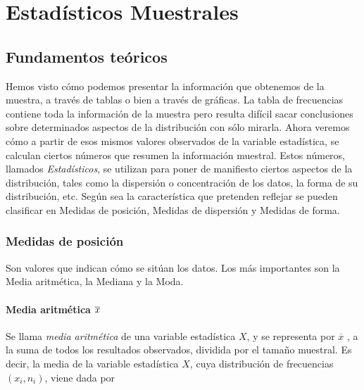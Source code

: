 
\chapter{Estadísticos Muestrales}

\section{Fundamentos teóricos}

Hemos visto cómo podemos presentar la información que obtenemos de
la muestra, a través de tablas o bien a través de gráficas. La tabla
de frecuencias contiene toda la información de la muestra pero
resulta difícil sacar conclusiones sobre determinados aspectos de la
distribución con sólo mirarla. Ahora veremos cómo a partir de esos
mismos valores observados de la variable estadística, se calculan
ciertos números que resumen la información muestral. Estos números,
llamados \emph{Estadísticos}, se utilizan para poner de manifiesto
ciertos aspectos de la distribución, tales como la dispersión o
concentración de los datos, la forma de su distribución, etc. Según
sea la característica que pretenden reflejar se pueden clasificar en
Medidas de posición, Medidas de dispersión y Medidas de forma.

\subsection{Medidas de posición}

Son valores que indican cómo se sitúan los datos. Los más
importantes son la Media aritmética, la Mediana y la Moda.

\subsubsection{Media aritmética $ \overline{\mbox{\textit{x}}}$}

Se llama \emph{media aritmética} de una variable estadística $X$, y
se representa por $\overline{x}$ , a la suma de todos los resultados
observados, dividida por el tamaño muestral. Es decir, la media de
la variable estadística $X$, cuya distribución de frecuencias
$(x_i,n_i)$, viene dada por

